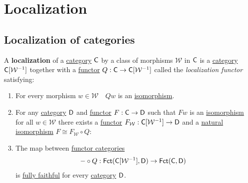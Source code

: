 \documentclass[../../main]{subfiles}
\begin{document}
\chapter{Localization}\label{chapter:localization}

\section{Localization of categories}

\begin{definition}\label{def:localization-category}
  A \textbf{localization} of a \hyperref[def:category]{category} \(\mathsf{C}\) by a class of morphisms \(\mathcal{W}\) in \(\mathsf{C}\) is a \hyperref[def:category]{category} \(\mathsf{C}[\mathcal{W}^{-1}]\) together with a \hyperref[def:functor]{functor} \(Q: \mathsf{C} \to \mathsf{C}[\mathcal{W}^{-1}]\) called the \textit{localization functor} satisfying:
  \begin{enumerate}
    \item For every morphism \(w \in \mathcal{W} \quad Qw\) is an \hyperref[def:categorical-isomorphism]{isomorphism}.
    \item For any \hyperref[def:category]{category} \(\mathsf{D}\) and \hyperref[def:functor]{functor} \(F: \mathsf{C} \to \mathsf{D}\) such that \(Fw\) is an \hyperref[def:categorical-isomorphims]{isomorphism} for all \(w \in \mathcal{W}\) there exists a \hyperref[def:functor]{functor} \(F_{\mathcal{W}}: \mathsf{C}[\mathcal{W}^{-1}] \to \mathsf{D}\) and a \hyperref[def:natural-transformation]{natural isomorphism} \(F \cong F_{\mathcal{W}} \circ Q\):
          \begin{center}
          \end{center}
    \item The map between \hyperref[def:functor-category]{functor categories}
          \begin{equation*}
            - \circ Q: \mathsf{Fct}(\mathsf{C}[\mathcal{W}^{-1}], \mathsf{D}) \to \mathsf{Fct}(\mathsf{C}, \mathsf{D})
          \end{equation*}
          is \hyperref[def:functor-types]{fully faithful} for every \hyperref[def:category]{category} \(\mathsf{D}\).


\end{enumerate}
\end{definition}
\end{document}

